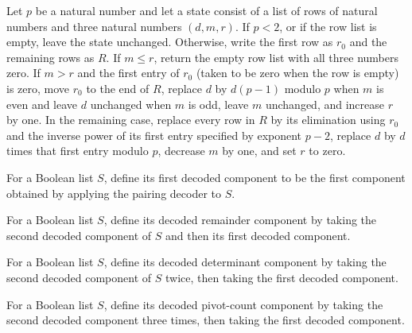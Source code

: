 \begin{definition}
\label{Complexity.BinArith.detStep}
\leanok
{}
Let $p$ be a natural number and let a state consist of a list of rows of natural numbers
and three natural numbers $(d,m,r)$. If $p<2$, or if the row list is empty, leave the
state unchanged. Otherwise, write the first row as $r_0$ and the remaining rows as $R$.
If $m\le r$, return the empty row list with all three numbers zero. If $m>r$ and the
first entry of $r_0$ (taken to be zero when the row is empty) is zero, move $r_0$ to the
end of $R$, replace $d$ by $d(p-1)$ modulo $p$ when $m$ is even and leave $d$ unchanged
when $m$ is odd, leave $m$ unchanged, and increase $r$ by one. In the remaining case,
replace every row in $R$ by its elimination using $r_0$ and the inverse power of its
first entry specified by exponent $p-2$, replace $d$ by $d$ times that first entry
modulo $p$, decrease $m$ by one, and set $r$ to zero.
\end{definition}

\begin{definition}
\label{Complexity.BinArith.slP}
\leanok
{}
For a Boolean list $S$, define its first decoded component to be the first component
obtained by applying the pairing decoder to $S$.
\end{definition}

\begin{definition}
\label{Complexity.BinArith.slR}
\leanok
{}
For a Boolean list $S$, define its decoded remainder component by taking the second
decoded component of $S$ and then its first decoded component.
\end{definition}

\begin{definition}
\label{Complexity.BinArith.slD}
\leanok
{}
For a Boolean list $S$, define its decoded determinant component by taking the second
decoded component of $S$ twice, then taking the first decoded component.
\end{definition}

\begin{definition}
\label{Complexity.BinArith.slM}
\leanok
{}
For a Boolean list $S$, define its decoded pivot-count component by taking the second
decoded component three times, then taking the first decoded component.
\end{definition}

